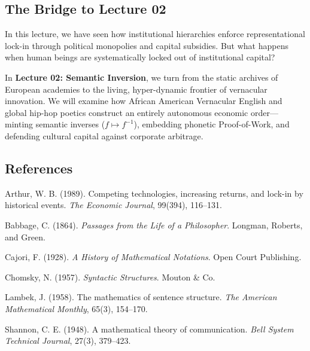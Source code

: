 \documentclass[11pt,letterpaper]{article}
\begin{document}
\subsection{The Bridge to Lecture 02}
In this lecture, we have seen how institutional hierarchies enforce representational lock-in through political monopolies and capital subsidies. But what happens when human beings are systematically locked out of institutional capital?

In \textbf{Lecture 02: Semantic Inversion}, we turn from the static archives of European academies to the living, hyper-dynamic frontier of vernacular innovation. We will examine how African American Vernacular English and global hip-hop poetics construct an entirely autonomous economic order---minting semantic inverses ($f \mapsto f^{-1}$), embedding phonetic Proof-of-Work, and defending cultural capital against corporate arbitrage.

\subsection*{References}
\begin{enumerate}[label={[\arabic*]},noitemsep,topsep=1pt]
\small
\item Arthur, W. B. (1989). Competing technologies, increasing returns, and lock-in by historical events. \textit{The Economic Journal}, 99(394), 116--131.
\item Babbage, C. (1864). \textit{Passages from the Life of a Philosopher}. Longman, Roberts, and Green.
\item Cajori, F. (1928). \textit{A History of Mathematical Notations}. Open Court Publishing.
\item Chomsky, N. (1957). \textit{Syntactic Structures}. Mouton \& Co.
\item Lambek, J. (1958). The mathematics of sentence structure. \textit{The American Mathematical Monthly}, 65(3), 154--170.
\item Shannon, C. E. (1948). A mathematical theory of communication. \textit{Bell System Technical Journal}, 27(3), 379--423.
\end{enumerate}
\end{document}
